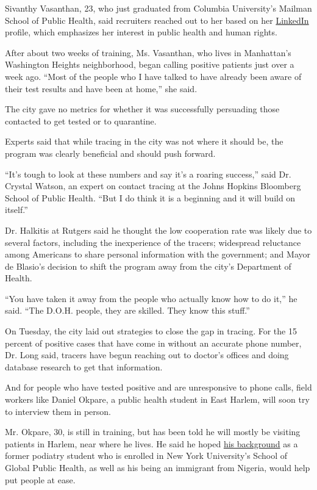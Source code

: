 Sivanthy Vasanthan, 23, who just graduated from Columbia University's
Mailman School of Public Health, said recruiters reached out to her
based on her
\href{https://www.linkedin.com/in/sivanthyvasanthan/}{LinkedIn} profile,
which emphasizes her interest in public health and human rights.

After about two weeks of training, Ms. Vasanthan, who lives in
Manhattan's Washington Heights neighborhood, began calling positive
patients just over a week ago. ``Most of the people who I have talked to
have already been aware of their test results and have been at home,''
she said.

The city gave no metrics for whether it was successfully persuading
those contacted to get tested or to quarantine.

Experts said that while tracing in the city was not where it should be,
the program was clearly beneficial and should push forward.

``It's tough to look at these numbers and say it's a roaring success,''
said Dr. Crystal Watson, an expert on contact tracing at the Johns
Hopkins Bloomberg School of Public Health. ``But I do think it is a
beginning and it will build on itself.''

Dr. Halkitis at Rutgers said he thought the low cooperation rate was
likely due to several factors, including the inexperience of the
tracers; widespread reluctance among Americans to share personal
information with the government; and Mayor de Blasio's decision to shift
the program away from the city's Department of Health.

``You have taken it away from the people who actually know how to do
it,'' he said. ``The D.O.H. people, they are skilled. They know this
stuff.''

On Tuesday, the city laid out strategies to close the gap in tracing.
For the 15 percent of positive cases that have come in without an
accurate phone number, Dr. Long said, tracers have begun reaching out to
doctor's offices and doing database research to get that information.

And for people who have tested positive and are unresponsive to phone
calls, field workers like Daniel Okpare, a public health student in East
Harlem, will soon try to interview them in person.

Mr. Okpare, 30, is still in training, but has been told he will mostly
be visiting patients in Harlem, near where he lives. He said he hoped
\href{https://www.linkedin.com/in/domph/}{his background} as a former
podiatry student who is enrolled in New York University's School of
Global Public Health, as well as his being an immigrant from Nigeria,
would help put people at ease.

